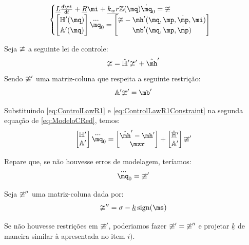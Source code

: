 \documentclass[a4paper,11pt,brazil,fleqn]{article}
\begin{document}
\begin{itemize}
$$
\begin{cases}
\underline{L} \frac{\dd \mi}{\dd t} + \underline{R} \mi + \underline{k_w r} \mZ (\mq) \dot{\mq}_0= \mup
\\
\begin{bmatrix}
\mH'(\mq) \\
\mA'(\mq)
\end{bmatrix}
\dddot{\mq}_0
=
\begin{bmatrix}
\mup - \mh'(\mq,\mp,\dot{\mp}, \mi) \\
\mb'(\mq,\mp,\dot{\mp})
\end{bmatrix}
\end{cases}
$$

Seja $\mathbb{\upsilon}$ a seguinte lei de controle:
\begin{equation} \label{eq:ControlLawR1}
\mup = \hat{\mH}' \mup' + \hat{\mh}'
\end{equation}
Sendo $\mathbb{\upsilon}'$ uma matriz-coluna que respeita a seguinte restri\c{c}\~ao:
\begin{equation} \label{eq:ControlLawR1Constraint}
\mA' \mup' = \mb'
\end{equation}

Substituindo \eqref{eq:ControlLawR1} e \eqref{eq:ControlLawR1Constraint} na segunda equa\c{c}\~ao de \eqref{eq:ModeloCRed}, temos:
\begin{equation}
\begin{bmatrix}
\mH' \\
\mA'
\end{bmatrix}
\dddot{\mq}_0
=
\begin{bmatrix}
\hat{\mh}' - \mh' \\
\mzr
\end{bmatrix}
+
\begin{bmatrix}
\hat{\mH}' \\
\mA'
\end{bmatrix}
\mup'
\end{equation}

Repare que, se n\~ao houvesse erros de modelagem, ter\'iamos:
\begin{equation}
\dddot{\mq}_0 = \mup'
\end{equation}

Seja $\mathbb{\upsilon}''$ uma matriz-coluna dada por:
\begin{equation}
\mup'' = \sigma - \underline{k} \sign(\ms)
\end{equation}

Se n\~ao houvesse restri\c{c}\~oes em $\mathbb{\upsilon}'$,  poderiamos fazer $ \mathbb{\upsilon}' = \mathbb{\upsilon}'' $ e projetar $\underline{k}$ de maneira similar \`a apresentada no item $i)$.


\end{itemize}
\end{document}
